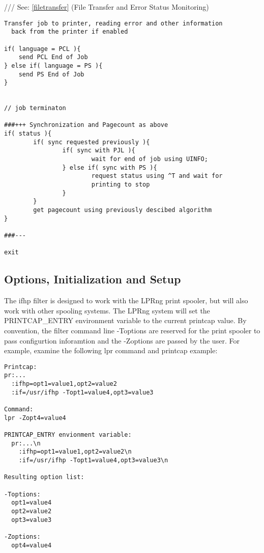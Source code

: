 \documentclass[a4paper]{article}
\begin{document}
{\ttfamily ///} See: \ref{filetransfer} {(File Transfer and Error Status Monitoring)}
\begin{tscreen}
\begin{verbatim}
Transfer job to printer, reading error and other information
  back from the printer if enabled

if( language = PCL ){
    send PCL End of Job
} else if( language = PS ){
    send PS End of Job
}


// job terminaton

###+++ Synchronization and Pagecount as above
if( status ){
        if( sync requested previously ){
                if( sync with PJL ){
                        wait for end of job using UINFO;
                } else if( sync with PS ){
                        request status using ^T and wait for
                        printing to stop
                }
        }
        get pagecount using previously descibed algorithm
}
        
###---

exit
\end{verbatim}
\end{tscreen}



\subsection{Options, Initialization and Setup
\label{setup}}

The
{\ttfamily ifhp}
filter is designed to work with the LPRng print spooler,
but will also work with other spooling systems.
The LPRng system will set the 
{\ttfamily PRINTCAP\_ENTRY}
environment variable to the current printcap value.
By convention,
the filter command line
{\ttfamily -Toptions}
are reserved for the print spooler to pass configurtion inforamtion
and the
{\ttfamily -Zoptions}
are passed by the user.
For example,
examine the following
{\ttfamily lpr}
command and printcap example:
\begin{tscreen}
\begin{verbatim}
Printcap:
pr:...
  :ifhp=opt1=value1,opt2=value2
  :if=/usr/ifhp -Topt1=value4,opt3=value3

Command:
lpr -Zopt4=value4

PRINTCAP_ENTRY envionment variable: 
  pr:...\n
    :ifhp=opt1=value1,opt2=value2\n
    :if=/usr/ifhp -Topt1=value4,opt3=value3\n

Resulting option list:

-Toptions:
  opt1=value4
  opt2=value2
  opt3=value3

-Zoptions:
  opt4=value4
\end{verbatim}
\end{tscreen}
\end{document}
